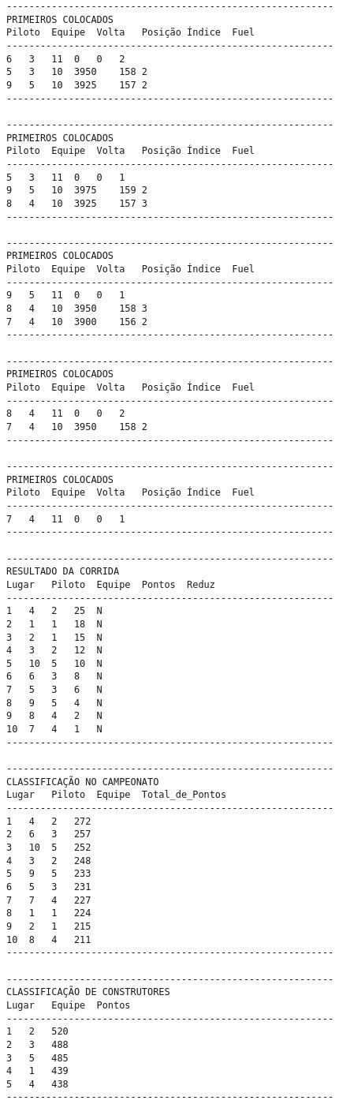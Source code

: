 \documentclass[12pt]{article}
\begin{document}
\begin{verbatim}
----------------------------------------------------------
PRIMEIROS COLOCADOS
Piloto	Equipe	Volta	Posição	Índice	Fuel
----------------------------------------------------------
6	3	11	0	0	2
5	3	10	3950	158	2
9	5	10	3925	157	2
----------------------------------------------------------

----------------------------------------------------------
PRIMEIROS COLOCADOS
Piloto	Equipe	Volta	Posição	Índice	Fuel
----------------------------------------------------------
5	3	11	0	0	1
9	5	10	3975	159	2
8	4	10	3925	157	3
----------------------------------------------------------

----------------------------------------------------------
PRIMEIROS COLOCADOS
Piloto	Equipe	Volta	Posição	Índice	Fuel
----------------------------------------------------------
9	5	11	0	0	1
8	4	10	3950	158	3
7	4	10	3900	156	2
----------------------------------------------------------

----------------------------------------------------------
PRIMEIROS COLOCADOS
Piloto	Equipe	Volta	Posição	Índice	Fuel
----------------------------------------------------------
8	4	11	0	0	2
7	4	10	3950	158	2
----------------------------------------------------------

----------------------------------------------------------
PRIMEIROS COLOCADOS
Piloto	Equipe	Volta	Posição	Índice	Fuel
----------------------------------------------------------
7	4	11	0	0	1
----------------------------------------------------------

----------------------------------------------------------
RESULTADO DA CORRIDA
Lugar	Piloto	Equipe	Pontos	Reduz
----------------------------------------------------------
1	4	2	25	N
2	1	1	18	N
3	2	1	15	N
4	3	2	12	N
5	10	5	10	N
6	6	3	8	N
7	5	3	6	N
8	9	5	4	N
9	8	4	2	N
10	7	4	1	N
----------------------------------------------------------

----------------------------------------------------------
CLASSIFICAÇÃO NO CAMPEONATO
Lugar	Piloto	Equipe	Total_de_Pontos
----------------------------------------------------------
1	4	2	272
2	6	3	257
3	10	5	252
4	3	2	248
5	9	5	233
6	5	3	231
7	7	4	227
8	1	1	224
9	2	1	215
10	8	4	211
----------------------------------------------------------

----------------------------------------------------------
CLASSIFICAÇÃO DE CONSTRUTORES
Lugar	Equipe	Pontos
----------------------------------------------------------
1	2	520
2	3	488
3	5	485
4	1	439
5	4	438
----------------------------------------------------------
\end{verbatim}

\end{document}
